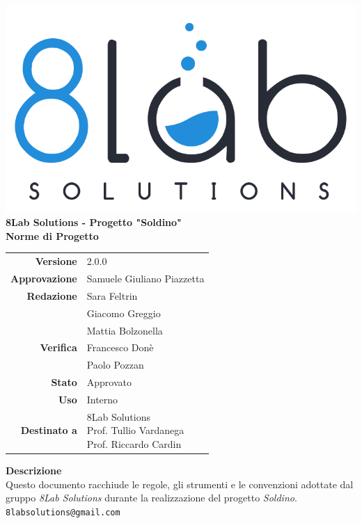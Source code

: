 \thispagestyle{empty}
\begin{titlepage}
	\begin{center}
		\includegraphics[scale = 0.3]{res/images/logo8_crop.png}\\
		\large \textbf{8Lab Solutions - Progetto "Soldino"} \\
		\vfill
		\Huge \textbf{Norme di Progetto}
		\vspace*{\fill} 
        \vfill
        \large
        \begin{tabular}{r|l}
                        \textbf{Versione} & 2.0.0\\
                        \textbf{Approvazione} & Samuele Giuliano Piazzetta\\
                        \textbf{Redazione} & Sara Feltrin\\&
                        	Giacomo Greggio\\&
                        	Mattia Bolzonella
                        	\\
                      
                        \textbf{Verifica} & Francesco Donè
                        \\& Paolo Pozzan
                        \\
                        \textbf{Stato} & Approvato\\
                        \textbf{Uso} & Interno\\
                        \textbf{Destinato a} & \parbox[t]{5cm}{8Lab Solutions\\Prof. Tullio Vardanega\\Prof. Riccardo Cardin}
                \end{tabular}
                \vfill
                \normalsize
                \textbf{Descrizione}\\
                Questo documento racchiude le regole, gli strumenti e le convenzioni adottate dal gruppo \textit{8Lab Solutions} durante la realizzazione del progetto \textit{Soldino}.\\
                \vfill
                \small
                \texttt{8labsolutions@gmail.com}
	\end{center}
\end{titlepage}